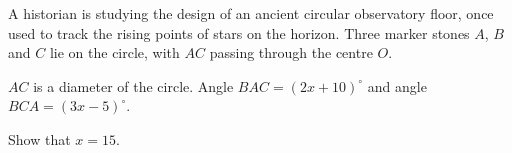 \begin{question}
\noindent A historian is studying the design of an ancient circular observatory floor, once used to track the rising points of stars on the horizon. Three marker stones $A$, $B$ and $C$ lie on the circle, with $AC$ passing through the centre $O$.

\begin{center}
\end{center}

\noindent $AC$ is a diameter of the circle. Angle $BAC = (2x+10)^\circ$ and angle $BCA = (3x-5)^\circ$.

\noindent Show that $x = 15$.

\vspace{5cm}

\begin{flushright}
\end{flushright}
\end{question}
